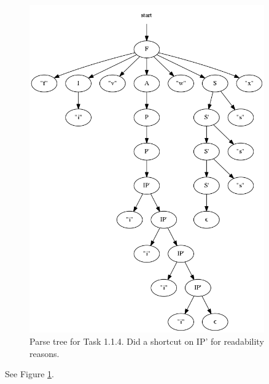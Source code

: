 \begin{figure}[here]
	\includegraphics[width=0.9\textwidth]{img/graph.png}
	\caption{Parse tree for Task 1.1.4. Did a shortcut on IP' for readability reasons.}
	 \label{fig:parsetree}
\end{figure}
See Figure \ref{fig:parsetree}.
\subsubsection{}


